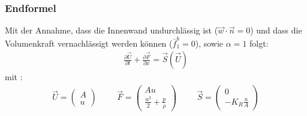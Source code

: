 \begin{frame}
\frametitle{\textbf{Endformel}}
Mit der Annahme, dass die Innenwand undurchlässig ist ($\vec{w}\cdot \vec{n}=0$) und dass die Volumenkraft vernachlässigt werden können ($\bar{f}^b_1=0$), sowie $\alpha=1$ folgt:
\begin{align}
\boxed{\frac{\partial \vec{U}}{\partial t}+\frac{\partial \vec{F}}{\partial x}=\vec{S}(\vec{U})}
\end{align}
mit :
\begin{align*}
\vec{U}=\begin{pmatrix} A \\ u \end{pmatrix} \hspace{1cm} \vec{F}=\begin{pmatrix} Au \\ \frac{u^2}{2} + \frac{p}{\rho}
\end{pmatrix} \hspace{1cm} \vec{S}=\begin{pmatrix} 0 \\ -K_R \frac{u}{A}
\end{pmatrix}
\end{align*}
\end{frame}
